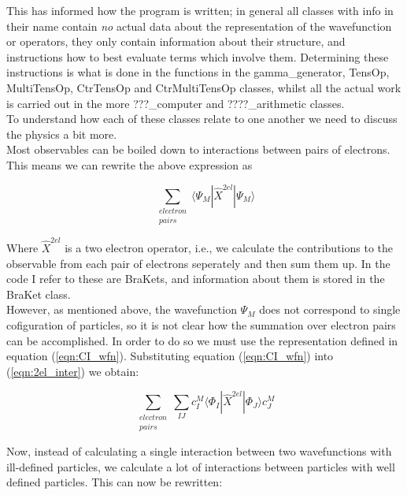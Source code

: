 \documentclass[12pt]{article}
\begin{document}
This has informed how the program is written; in general all classes with info
in their name contain \emph{no} actual data about the representation of the wavefunction or operators,
they only contain information about their structure, and instructions how to best evaluate 
terms which involve them. Determining these instructions is what is done in the functions in the
gamma\_generator, TensOp, MultiTensOp, CtrTensOp and CtrMultiTensOp classes, whilst all the actual
work is carried out in the more ???\_computer and ????\_arithmetic classes.\\

To understand how each of these classes relate to one another we need to discuss the physics a bit more.\\

Most observables can be boiled down to interactions between pairs of electrons. This means we can rewrite the above expression as

\begin{equation}
\sum_{\substack{electron \\ pairs}} \langle \Psi_{M} | \hat{X}^{2el}| \Psi_{M} \rangle
\label{eqn:2el_inter}
\end{equation}

Where $\hat{X}^{2el}$ is a two electron operator, i.e., we calculate the
contributions to the observable from each pair of electrons seperately and then
sum them up. In the code I refer to these are BraKets, and information about them
is stored in the BraKet class.\\ 

However, as mentioned above, the wavefunction $\Psi_{M}$ does not
correspond to single cofiguration of particles, so it is not clear how the
summation over electron pairs can be accomplished. In order to do so we must
use the representation defined in equation (\ref{eqn:CI_wfn}). Substituting
equation (\ref{eqn:CI_wfn}) into (\ref{eqn:2el_inter}) we obtain:

\begin{equation}
\sum_{\substack{electron \\ pairs}}\sum_{IJ}
 c^{M}_{I}\langle \Phi_{I} | \hat{X}^{2el} | \Phi_{J} \rangle c_{J}^{M}
\label{eqn:2el_inter_2}
\end{equation}

Now, instead of calculating a single interaction between two wavefunctions with ill-defined particles,
we calculate a lot of interactions between particles with well defined particles. This can now be rewritten: 
\end{document}
